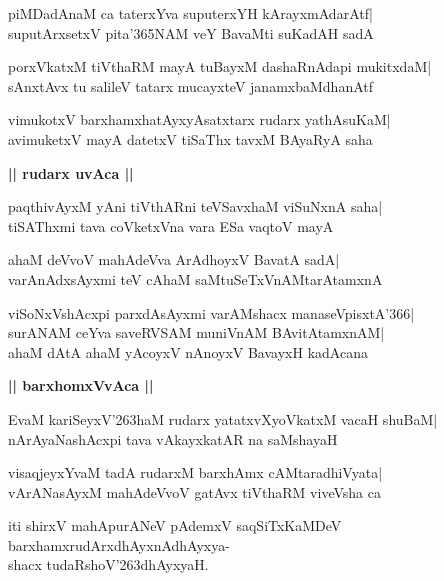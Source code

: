 \documentclass[twoside,12pt,openright]{book}
\def\S{\char'263}
\newcounter{shloka}[chapter]
\def\uvaca#1{\centerline{{\large\textbf{#1}}}}
\begin{document}
\begin{shloka}%
piMDadAnaM ca taterxYva suputerxYH kArayxmAdarAtf|\\
suputArxsetxV pita\char'365NAM veY BavaMti suKadAH sadA
\end{shloka}

\begin{shloka}%
porxVkatxM tiVthaRM mayA tuBayxM dashaRnAdapi mukitxdaM|\\
sAnxtAvx tu salileV tatarx mucayxteV janamxbaMdhanAtf
\end{shloka}

\begin{shloka}%
vimukotxV barxhamxhatAyxyAsatxtarx rudarx yathAsuKaM|\\
avimuketxV mayA datetxV tiSaThx tavxM BAyaRyA saha
\end{shloka}

\uvaca{|| rudarx uvAca ||}
\begin{shloka}%
paqthivAyxM yAni tiVthARni teVSavxhaM viSuNxnA saha|\\
tiSAThxmi tava coVketxVna vara ESa vaqtoV mayA
\end{shloka}

\begin{shloka}%
ahaM deVvoV mahAdeVva ArAdhoyxV BavatA sadA|\\
varAnAdxsAyxmi teV cAhaM saMtuSeTxVnAMtarAtamxnA
\end{shloka}

\begin{shloka}%
viSoNxVshAcxpi parxdAsAyxmi varAMshacx manaseVpisxtA\char'366|\\
surANAM ceYva saveRVSAM muniVnAM BAvitAtamxnAM|\\
ahaM dAtA ahaM yAcoyxV nAnoyxV BavayxH kadAcana
\end{shloka}

\uvaca{|| barxhomxVvAca ||}
\begin{shloka}%
EvaM kariSeyxV\S haM rudarx yatatxvXyoVkatxM vacaH shuBaM|\\
nArAyaNashAcxpi tava vAkayxkatAR na saMshayaH
\end{shloka}

\begin{shloka}%
visaqjeyxYvaM tadA rudarxM barxhAmx cAMtaradhiVyata|\\
vArANasAyxM mahAdeVvoV gatAvx tiVthaRM viveVsha ca
\end{shloka}

\begin{center}
 iti shirxV mahApurANeV pAdemxV saqSiTxKaMDeV \\
barxhamxrudArxdhAyxnAdhAyxya-\\
shacx tudaRshoV\S dhAyxyaH.\\
\end{center}
\end{document}

